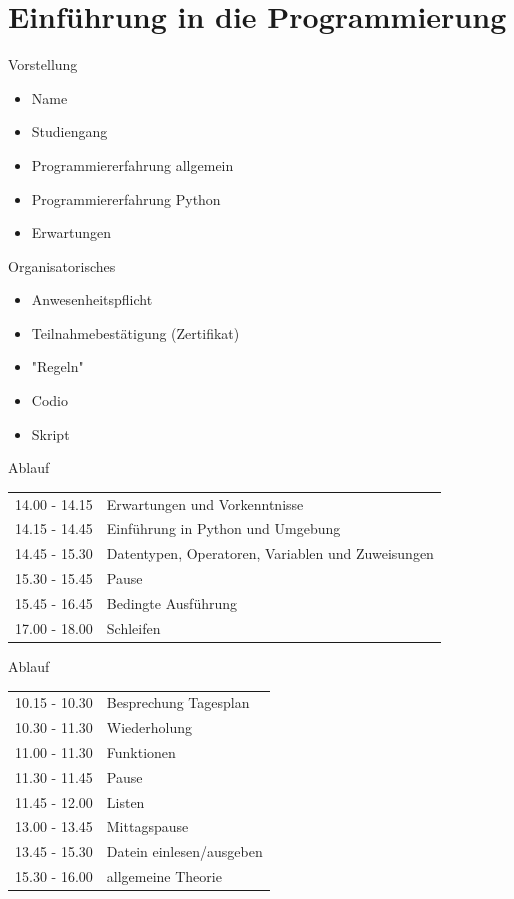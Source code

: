 \section{Einführung in die Programmierung}

\begin{frame}{Vorstellung}
\begin{itemize}
	\item Name
	\item Studiengang 
	\item Programmiererfahrung allgemein
	\item Programmiererfahrung Python
	\item Erwartungen
\end{itemize}
\end{frame}

\begin{frame}{Organisatorisches}
    \begin{itemize}
        \item Anwesenheitspflicht
        \item Teilnahmebestätigung (Zertifikat)
        \item "Regeln"
        \item Codio
        \item Skript
    \end{itemize}
\end{frame}

\begin{frame}{Ablauf}
\begin{tabular}{ l l }
	14.00 - 14.15 & Erwartungen und Vorkenntnisse\\
	14.15 - 14.45 & Einführung in Python und Umgebung \\
	14.45 - 15.30 & Datentypen, Operatoren, Variablen und Zuweisungen\\
	15.30 - 15.45 & Pause \\
	15.45 - 16.45 & Bedingte Ausführung \\
	17.00 - 18.00 & Schleifen \\
	
\end{tabular}
\end{frame}

\begin{frame}{Ablauf}

\begin{tabular}{ l l }
	10.15 - 10.30 & Besprechung Tagesplan\\
	10.30 - 11.30 & Wiederholung \\
	11.00 - 11.30 & Funktionen \\
	11.30 - 11.45 & Pause\\
	11.45 - 12.00 & Listen\\
	13.00 - 13.45 & Mittagspause\\
	13.45 - 15.30 & Datein einlesen/ausgeben\\
	15.30 - 16.00 & allgemeine Theorie\\
	
\end{tabular}
\end{frame}

